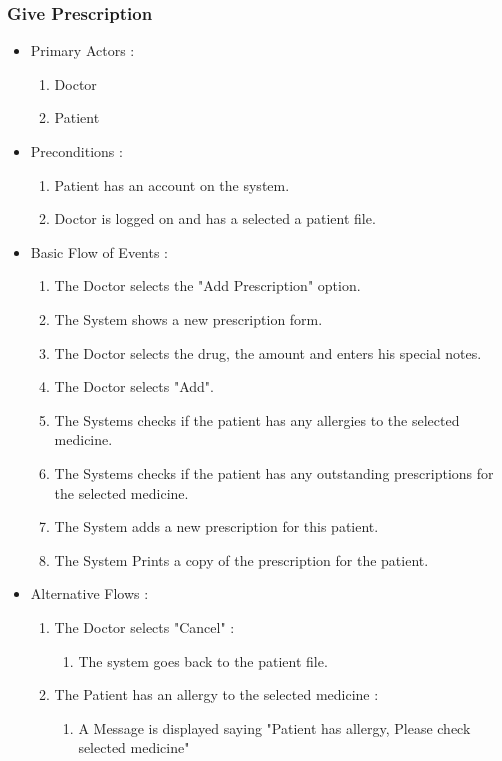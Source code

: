 \documentclass[14pt]{article}
\begin{document}
\subsubsection{Give Prescription}
\begin{itemize}
		\item Primary Actors : 
			\begin{enumerate}
				\item Doctor
				\item Patient
			\end{enumerate}
		\item Preconditions :
			\begin{enumerate}
				\item Patient has an account on the system.
				\item Doctor is logged on and has a selected a patient file.
			\end{enumerate}
		\item Basic Flow of Events :
			\begin{enumerate}
				\item The Doctor selects the "Add Prescription" option.
				\item The System shows a new prescription form.
				\item The Doctor selects the drug, the amount and enters his special notes.
				\item The Doctor selects "Add".
				\item The Systems checks if the patient has any allergies to the selected medicine.
				\item The Systems checks if the patient has any outstanding prescriptions for the selected medicine.
				\item The System adds a new prescription for this patient.
				\item The System Prints a copy of the prescription for the patient. 
			\end{enumerate}
		\item Alternative Flows :
			\begin{enumerate}
				\item The Doctor selects "Cancel" : 
					\begin{enumerate}
						\item The system goes back to the patient file.
					\end{enumerate}
				\item The Patient has an allergy to the selected medicine :
					\begin{enumerate}
						\item A Message is displayed saying "Patient has allergy, Please check selected medicine"

\end{enumerate}
\end{enumerate}
\end{itemize}
\end{document}
